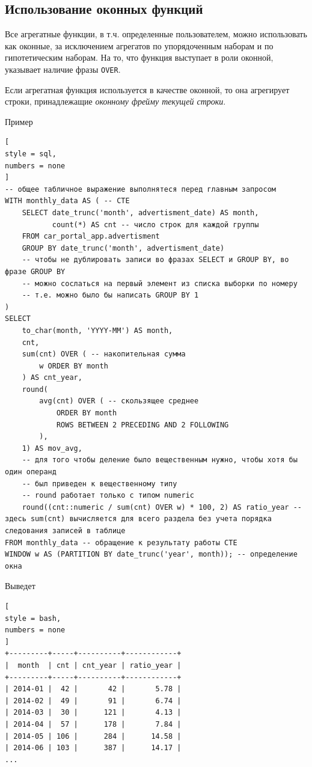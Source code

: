 \documentclass[%
	11pt,
	a4paper,
	utf8,
		]{article}
\begin{document}
\subsection{Использование оконных функций}

Все агрегатные функции, в т.ч. определенные пользователем, можно использовать как оконные, за исключением агрегатов по упорядоченным наборам и по гипотетическим наборам. На то, что функция выступает в роли оконной, указывает наличие фразы \texttt{OVER}.

Если агрегатная функция используется в качестве оконной, то она агрегирует строки, принадлежащие \emph{оконному фрейму текущей строки}.

Пример
\begin{lstlisting}[
style = sql,
numbers = none
]
-- общее табличное выражение выполнятеся перед главным запросом
WITH monthly_data AS ( -- CTE
    SELECT date_trunc('month', advertisment_date) AS month,
           count(*) AS cnt -- число строк для каждой группы
    FROM car_portal_app.advertisment
    GROUP BY date_trunc('month', advertisment_date)
    -- чтобы не дублировать записи во фразах SELECT и GROUP BY, во фразе GROUP BY
    -- можно сослаться на первый элемент из списка выборки по номеру
    -- т.е. можно было бы написать GROUP BY 1
)
SELECT
    to_char(month, 'YYYY-MM') AS month,
    cnt,
    sum(cnt) OVER ( -- накопительная сумма
        w ORDER BY month
    ) AS cnt_year, 
    round(
        avg(cnt) OVER ( -- скользящее среднее
            ORDER BY month
            ROWS BETWEEN 2 PRECEDING AND 2 FOLLOWING
        ),
    1) AS mov_avg,
    -- для того чтобы деление было вещественным нужно, чтобы хотя бы один операнд
    -- был приведен к вещественному типу
    -- round работает только с типом numeric
    round((cnt::numeric / sum(cnt) OVER w) * 100, 2) AS ratio_year -- здесь sum(cnt) вычисляется для всего раздела без учета порядка следования записей в таблице
FROM monthly_data -- обращение к результату работы CTE
WINDOW w AS (PARTITION BY date_trunc('year', month)); -- определение окна
\end{lstlisting}

Выведет
\begin{lstlisting}[
style = bash,
numbers = none
]
+---------+-----+----------+------------+
|  month  | cnt | cnt_year | ratio_year |
+---------+-----+----------+------------+
| 2014-01 |  42 |       42 |       5.78 |
| 2014-02 |  49 |       91 |       6.74 |
| 2014-03 |  30 |      121 |       4.13 |
| 2014-04 |  57 |      178 |       7.84 |
| 2014-05 | 106 |      284 |      14.58 |
| 2014-06 | 103 |      387 |      14.17 |
...
\end{lstlisting}
\end{document}
